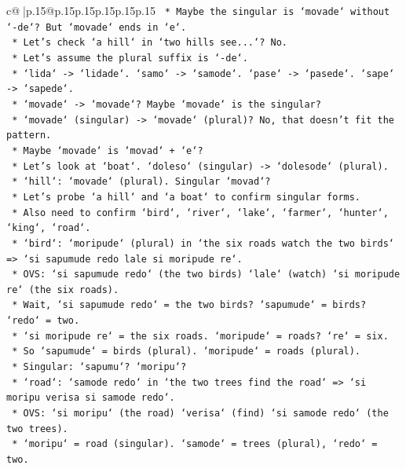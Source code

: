 \documentclass{article}
\begin{document}
{\begin{supertabular}{c@{$\;$}|p{.15\linewidth}@{}p{.15\linewidth}p{.15\linewidth}p{.15\linewidth}p{.15\linewidth}p{.15\linewidth}}
{{{\texttt{        *   Maybe the singular is `movade` without `{-}de`? But `movade` ends in `e`.} \\
\texttt{        *   Let's check `a hill` in `two hills see...`? No.} \\
\texttt{        *   Let's assume the plural suffix is `{-}de`.} \\
\texttt{        *   `lida` {-}> `lidade`. `samo` {-}> `samode`. `pase` {-}> `pasede`. `sape` {-}> `sapede`.} \\
\texttt{        *   `movade` {-}> `movade`? Maybe `movade` is the singular?} \\
\texttt{        *   `movade` (singular) {-}> `movade` (plural)? No, that doesn't fit the pattern.} \\
\texttt{        *   Maybe `movade` is `movad` + `e`?} \\
\texttt{        *   Let's look at `boat`. `doleso` (singular) {-}> `dolesode` (plural).} \\
\texttt{        *   `hill`: `movade` (plural). Singular `movad`?} \\
\texttt{        *   Let's probe `a hill` and `a boat` to confirm singular forms.} \\
\texttt{        *   Also need to confirm `bird`, `river`, `lake`, `farmer`, `hunter`, `king`, `road`.} \\
\texttt{        *   `bird`: `moripude` (plural) in `the six roads watch the two birds` => `si sapumude redo lale si moripude re`.} \\
\texttt{        *   OVS: `si sapumude redo` (the two birds) `lale` (watch) `si moripude re` (the six roads).} \\
\texttt{        *   Wait, `si sapumude redo` = the two birds? `sapumude` = birds? `redo` = two.} \\
\texttt{        *   `si moripude re` = the six roads. `moripude` = roads? `re` = six.} \\
\texttt{        *   So `sapumude` = birds (plural). `moripude` = roads (plural).} \\
\texttt{        *   Singular: `sapumu`? `moripu`?} \\
\texttt{        *   `road`: `samode redo` in `the two trees find the road` => `si moripu verisa si samode redo`.} \\
\texttt{        *   OVS: `si moripu` (the road) `verisa` (find) `si samode redo` (the two trees).} \\
\texttt{        *   `moripu` = road (singular). `samode` = trees (plural), `redo` = two.} \\
}}}
\end{supertabular}}
\end{document}
